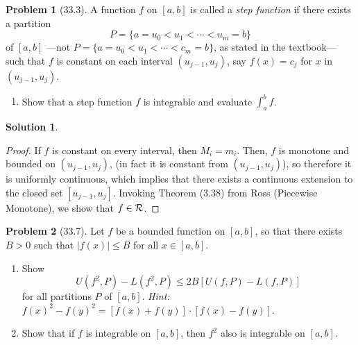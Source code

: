 \documentclass[12pt]{article}
\theoremstyle{definition} %
\newtheorem{solution}{Solution}
\newtheorem{problem}{Problem}
\theoremstyle{plain} %
\begin{document}
\begin{problem}[33.3]

    \noindent A function $ f $ on $[a, b]$ is called a \textit{step function} if there exists a partition 
    $$
    P = \{a = u_0 < u_1 < \cdots < u_m = b\}
    $$ 
    of $[a, b]$ —not $ P = \{a = u_0 < u_1 < \cdots < c_m = b\} $, as stated in the textbook— such that $ f $ is constant on each interval $(u_{j-1}, u_j)$, say $ f(x) = c_j $ for $ x $ in $(u_{j-1}, u_j)$.
    
    \begin{enumerate}
        \item Show that a step function $ f $ is integrable and evaluate $ \int_a^b f $.
    \end{enumerate}
    
\end{problem}
\begin{solution}
   \begin{proof}
    If $f$ is constant on every interval, then $M_i = m_i$. Then, $f$ is monotone and bounded on $\left( u_{j-1}, u_{j} \right) $, (in fact it is constant from $\left( u_{j-1},u_{j} \right) $), so therefore it is uniformly continuous, which implies that
    there exists a continuous extension to the closed set $[u_{j-1}, u_{j}] $. Invoking Theorem (3.38) from Ross (Piecewise Monotone), we show that $f\in \mathcal{\MakeUppercase{r}}$.   
   \end{proof} 
\end{solution}
\begin{problem}[33.7]
    Let $ f $ be a bounded function on $[a, b]$, so that there exists $ B > 0 $ such that $ |f(x)| \leq B $ for all $ x \in [a, b] $.

\begin{enumerate}
    \item Show
    $$
    U(f^2, P) - L(f^2, P) \leq 2B[U(f, P) - L(f, P)]
    $$
    for all partitions $ P $ of $[a, b]$. \textit{Hint:} $ f(x)^2 - f(y)^2 = [f(x) + f(y)] \cdot [f(x) - f(y)] $.
    \item Show that if $ f $ is integrable on $[a, b]$, then $ f^2 $ also is integrable on $[a, b]$.
\end{enumerate}
\end{problem}
\end{document}
